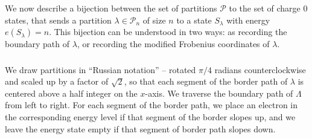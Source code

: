 \documentclass{amsart}[12pt]
\theoremstyle{definition}
\begin{document}
We now describe a bijection between the set of partitions $\mathcal{P}$ to the
set of charge 0 states, that sends a partition
$\lambda\in\mathcal{P}_n$ of size $n$ to a state $S_\lambda$ with
energy $e(S_\lambda)=n$.  This bijection can be understood in two ways:
as recording the boundary path of $\lambda$, or recording the modified
Frobenius coordinates of $\lambda$.


\subsubsection{}
We draw partitions in ``Russian
notation'' -- rotated $\pi/4$ radians counterclockwise and scaled up
by a factor of $\sqrt{2}$, so that each segment of the border path of
$\lambda$ is centered above a half integer on the $x$-axis.  We traverse the boundary path of $\Lambda$ from left to right.  For each segment of the border path, we place an electron in the corresponding energy level if that segment of the border slopes up, and we leave the energy state empty if that segment of border path slopes down.
\end{document}

